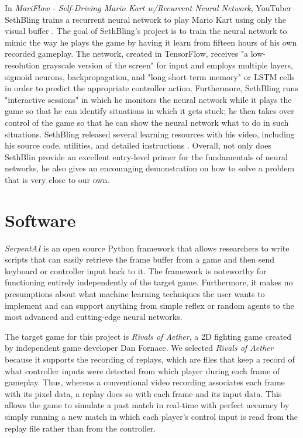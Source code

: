 In {\it MariFlow - Self-Driving Mario Kart w/Recurrent Neural Network}, YouTuber SethBling trains a recurrent neural network to play Mario Kart using only the visual buffer \cite{SethBling:2017}. The goal of SethBling's project is to train the neural network to mimic the way he plays the game by having it learn from fifteen hours of his own recorded gameplay. The network, created in TensorFlow, receives "a low-resolution grayscale version of the screen" for input and employs multiple layers, sigmoid neurons, backpropagation, and "long short term memory" or LSTM cells in order to predict the appropriate controller action. Furthermore, SethBling runs "interactive sessions" in which he monitors the neural network while it plays the game so that he can identify situations in which it gets stuck; he then takes over control of the game so that he can show the neural network what to do in such situations. SethBling released several learning resources with his video, including his source code, utilities, and detailed instructions \cite{SethBling:2017}. Overall, not only does SethBlin provide an excellent entry-level primer for the fundamentals of neural networks, he also gives an encouraging demonstration on how to solve a problem that is very close to our own.

\section{Software}
{\it SerpentAI} is an open source Python framework that allows researchers to write scripts that can easily retrieve the frame buffer from a game and then send keyboard or controller input back to it. The framework is noteworthy for functioning entirely independently of the target game. Furthermore, it makes no presumptions about what machine learning techniques the user wants to implement and can support anything from simple reflex or random agents to the most advanced and cutting-edge neural networks.

The target game for this project is {\it Rivals of Aether}, a 2D fighting game created by independent game developer Dan Fornace. We selected {\it Rivals of Aether} because it supports the recording of replays, which are files that keep a record of what controller inputs were detected from which player during each frame of gameplay. Thus, whereas a conventional video recording associates each frame with its pixel data, a replay does so with each frame and its input data. This allows the game to simulate a past match in real-time with perfect accuracy by simply running a new match in which each player's control input is read from the replay file rather than from the controller.

